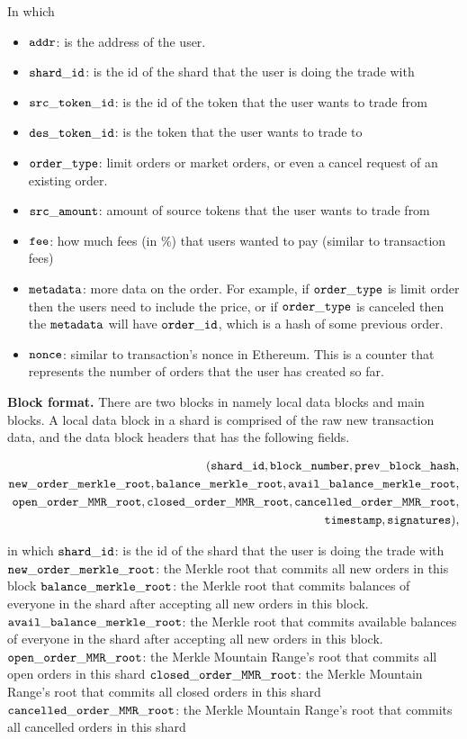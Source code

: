 In which
\begin{itemize}
\item ${\mathtt{addr}}$: is the address of the user.
\item ${\mathtt{shard\_id}}$: is the id of the shard that the user is doing the trade with
\item ${\mathtt{src\_token\_id}}$: is the id of the token that the user wants to trade from
\item ${\mathtt{des\_token\_id}}$: is the token that the user wants to trade to
\item ${\mathtt{order\_type}}$: limit orders or market orders, or even a cancel request of an existing order.
\item ${\mathtt{src\_amount}}$: amount of source tokens that the user wants to trade from
\item ${\mathtt{fee}}$: how much fees (in \%) that users wanted to pay (similar to transaction fees)
\item ${\mathtt{metadata}}$: more data on the order. For example, if ${\mathtt{order\_type}}$ is limit order then the users need to include the price, or if ${\mathtt{order\_type}}$ is canceled then the ${\mathtt{metadata}}$ will have ${\mathtt{order\_id}}$, which is a hash of some previous order.
\item ${\mathtt{nonce}}$: similar to transaction’s nonce in Ethereum. This is a counter that represents the number of orders that the user has created so far.
\end{itemize}

\textbf{Block format.} There are two blocks in \codename namely local data blocks and main blocks. A local data block in a shard is comprised of the raw new transaction data, and the data block headers that has the following fields.

\begin{align*}
({\mathtt{shard\_id}}, {\mathtt{block\_number}}, {\mathtt{prev\_block\_hash}},\\ {\mathtt{new\_order\_merkle\_root}}, {\mathtt{balance\_merkle\_root}}, {\mathtt{avail\_balance\_merkle\_root}},\\ {\mathtt{open\_order\_MMR\_root}}, {\mathtt{closed\_order\_MMR\_root}}, {\mathtt{cancelled\_order\_MMR\_root}},\\ {\mathtt{timestamp}}, {\mathtt{signatures}}),
\end{align*}

in which
${\mathtt{shard\_id}}$: is the id of the shard that the user is doing the trade with
${\mathtt{new\_order\_merkle\_root}}$: the Merkle root that commits all new orders in this block
${\mathtt{balance\_merkle\_root}}$: the Merkle root that commits balances of everyone in the shard after accepting all new orders in this block.
${\mathtt{avail\_balance\_merkle\_root}}$: the Merkle root that commits available balances of everyone in the shard after accepting all new orders in this block.
${\mathtt{open\_order\_MMR\_root}}$: the Merkle Mountain Range’s root that commits all open orders in this shard
${\mathtt{closed\_order\_MMR\_root}}$: the Merkle Mountain Range’s root that commits all closed orders in this shard
${\mathtt{cancelled\_order\_MMR\_root}}$: the Merkle Mountain Range’s root that commits all cancelled orders in this shard


